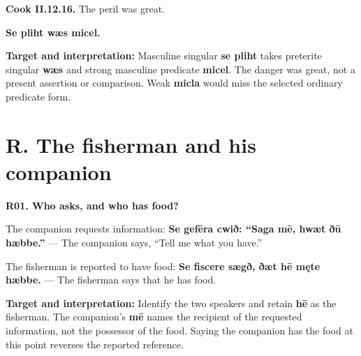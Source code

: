 \par\begin{minipage}{\linewidth}\raggedright
\textbf{Cook II.12.16.} The peril was great.

\textbf{Se pliht wæs micel.}

\textbf{Target and interpretation:} Masculine singular \textbf{se pliht} takes preterite singular \textbf{wæs} and strong masculine predicate \textbf{micel}. The danger was great, not a present assertion or comparison. Weak \textbf{micla} would miss the selected ordinary predicate form.

\end{minipage}\par\addvspace{4pt}

\section*{R. The fisherman and his companion}

\par\begin{minipage}{\linewidth}\raggedright
\textbf{R01. Who asks, and who has food?}

The companion requests information: \textbf{Se gefēra cwið: “Saga mē, hwæt ðū hæbbe.”} — The companion says, “Tell me what you have.”

The fisherman is reported to have food: \textbf{Se fiscere sægð, ðæt hē męte hæbbe.} — The fisherman says that he has food.

\textbf{Target and interpretation:} Identify the two speakers and retain \textbf{hē} as the fisherman. The companion's \textbf{mē} names the recipient of the requested information, not the possessor of the food. Saying the companion has the food at this point reverses the reported reference.

\end{minipage}\par\addvspace{4pt}


